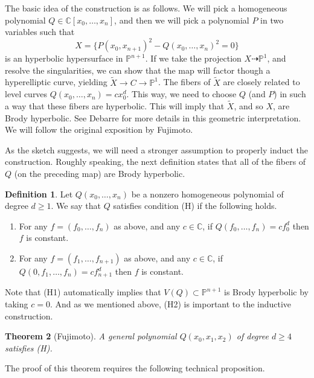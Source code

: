 \documentclass[leqno, openany]{memoir}
\newtheorem{thm}{Theorem}[section]
\theoremstyle{definition}
\newtheorem{defn}[thm]{Definition}
\theoremstyle{remark}
\theoremstyle{plain}
\theoremstyle{definition}
\theoremstyle{remark}
\newcommand{\C}{\mathbb{C}}
\renewcommand{\P}{\mathbb{P}}
\begin{document}
The basic idea of the construction is as follows. We will pick a homogeneous polynomial $Q \in \C[x_0, \dots, x_n]$, and then we will pick a polynomial $P$ in two variables such that
\[ X=\{P(x_0, x_{n+1})^2-Q(x_0, \dots, x_n)^2=0\} \]
is an hyperbolic hypersurface in $\P^{n+1}$. If we take the projection $X \dashrightarrow \P^1$, and resolve the singularities, we can show that the map will factor though a hyperelliptic curve, yielding $\tilde{X} \to C \to \P^1$. The fibers of $\tilde{X}$ are closely related to level curves $Q(x_0, \dots, x_n)=cx_0^d$. This way, we need to choose $Q$ (and $P$) in such a way that these fibers are hyperbolic. This will imply that $\tilde{X}$, and so $X$, are Brody hyperbolic. See Debarre for more details in this geometric interpretation. We will follow the original exposition by Fujimoto.

As the sketch suggests, we will need a stronger assumption to properly induct the construction. Roughly speaking, the next definition states that all of the fibers of $Q$ (on the preceding map) are Brody hyperbolic.

\begin{defn}
Let $Q(x_0, \dots, x_n)$ be a nonzero homogeneous polynomial of degree $d \geq 1$. We say that $Q$ satisfies condition (H) if the following holds.
\begin{enumerate}[label=(H\arabic*)]
\item For any $f=(f_0, \dots, f_n)$ as above, and any $c\in \mathbb{C}$, if $Q(f_0, \dots, f_n)=cf_0^d$ then $f$ is constant. 

\item For any $f=(f_1, \dots, f_{n+1})$ as above, and any $c \in \mathbb{C}$, if $Q(0, f_1, \dots, f_n)=cf_{n+1}^d$ then $f$ is constant.
\end{enumerate}
\end{defn}

Note that (H1) automatically implies that $V(Q) \subset \P^{n+1}$ is Brody hyperbolic by taking $c=0$. And as we mentioned above, (H2) is important to the inductive construction.

\begin{thm}[Fujimoto] \label{thm:fujimotoI}
A general polynomial $Q(x_0, x_1, x_2)$ of degree $d \geq 4$ satisfies \textit{(H)}.
\end{thm}

The proof of this theorem requires the following technical proposition.
\end{document}

